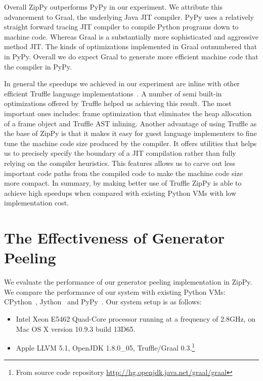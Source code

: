 Overall ZipPy outperforms PyPy in our experiment.
We attribute this advancement to Graal, the underlying Java JIT compiler.
PyPy uses a relatively straight forward tracing JIT compiler to compile Python programs down to machine code.
Whereas Graal is a substantially more sophisticated and aggressive method JIT.
The kinds of optimizations implemented in Graal outnumbered that in PyPy.
Overall we do expect Graal to generate more efficient machine code that the compiler in PyPy.

In general the speedups we achieved in our experiment are inline with other efficient Truffle language implementations~.
A number of semi built-in optimizations offered by Truffle helped us achieving this result.
The most important ones includes: frame optimization that eliminates the heap allocation of a frame object and Truffle AST inlining.
Another advantage of using Truffle as the base of ZipPy is that it makes it easy for guest language implementers to fine tune the machine code size produced by the compiler.
It offers utilities that helps us to precisely specify the boundary of a JIT compilation rather than fully relying on the compiler heuristics.
This features allows us to carve out less important code paths from the compiled code to make the machine code size more compact.
In summary, by making better use of Truffle ZipPy is able to achieve high speedups when compared with existing Python VMs with low implementation cost.

\section{The Effectiveness of Generator Peeling}

We evaluate the performance of our generator peeling implementation in ZipPy.
We compare the performance of our system with existing Python VMs: CPython~\cite{python}, Jython~\cite{jython} and PyPy~\cite{pypy}.
Our system setup is as follows:

\begin{itemize}

\item Intel Xeon E5462 Quad-Core processor running at a frequency of 2.8GHz, on Mac OS X version 10.9.3 build 13D65.

\item Apple LLVM 5.1, OpenJDK 1.8.0\_05, Truffle/Graal 0.3.\footnote{From source code repository \url{http://hg.openjdk.java.net/graal/graal}}

\end{itemize}

